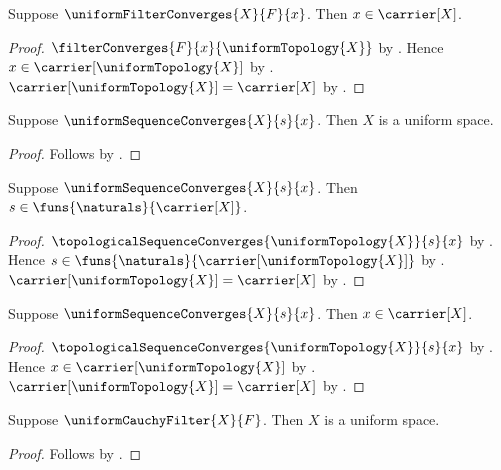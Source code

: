\begin{proposition}\label{uniform_filter_convergence_point}
    Suppose $\uniformFilterConverges{X}{F}{x}$.
    Then $x\in\carrier[X]$.
\end{proposition}
\begin{proof}
    $\filterConverges{F}{x}{\uniformTopology{X}}$
        by .
    Hence $x\in\carrier[\uniformTopology{X}]$
        by .
    $\carrier[\uniformTopology{X}]=\carrier[X]$
        by .
\end{proof}

\begin{proposition}\label{uniform_sequence_convergence_space}
    Suppose $\uniformSequenceConverges{X}{s}{x}$.
    Then $X$ is a uniform space.
\end{proposition}
\begin{proof}
    Follows by .
\end{proof}

\begin{proposition}\label{uniform_sequence_convergence_sequence}
    Suppose $\uniformSequenceConverges{X}{s}{x}$.
    Then $s\in\funs{\naturals}{\carrier[X]}$.
\end{proposition}
\begin{proof}
    $\topologicalSequenceConverges{\uniformTopology{X}}{s}{x}$
        by .
    Hence $s\in\funs{\naturals}{\carrier[\uniformTopology{X}]}$
        by .
    $\carrier[\uniformTopology{X}]=\carrier[X]$
        by .
\end{proof}

\begin{proposition}\label{uniform_sequence_convergence_point}
    Suppose $\uniformSequenceConverges{X}{s}{x}$.
    Then $x\in\carrier[X]$.
\end{proposition}
\begin{proof}
    $\topologicalSequenceConverges{\uniformTopology{X}}{s}{x}$
        by .
    Hence $x\in\carrier[\uniformTopology{X}]$
        by .
    $\carrier[\uniformTopology{X}]=\carrier[X]$
        by .
\end{proof}

\begin{proposition}\label{uniform_cauchy_filter_space}
    Suppose $\uniformCauchyFilter{X}{F}$.
    Then $X$ is a uniform space.
\end{proposition}
\begin{proof}
    Follows by .
\end{proof}

